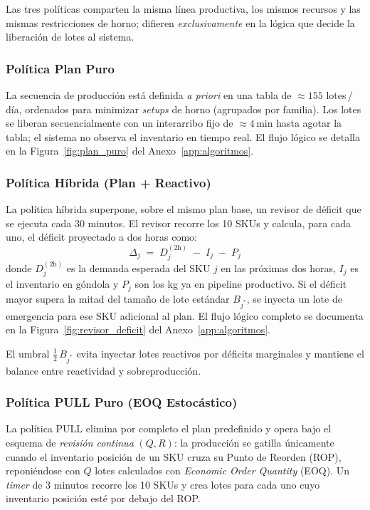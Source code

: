 \documentclass[10pt, a4paper]{article}
\begin{document}
Las tres pol\'iticas comparten la misma l\'inea productiva, los mismos
recursos y las mismas restricciones de horno; difieren \emph{exclusivamente}
en la l\'ogica que decide la liberaci\'on de lotes al sistema.

\subsubsection{Pol\'itica Plan Puro}

La secuencia de producci\'on est\'a definida \emph{a priori} en una tabla de
$\approx 155$ lotes\,/\,d\'ia, ordenados para minimizar \textit{setups} de
horno (agrupados por familia). Los lotes se liberan secuencialmente con un
interarribo fijo de $\approx 4$\,min hasta agotar la tabla; el sistema no
observa el inventario en tiempo real. El flujo l\'ogico se detalla en la
Figura~\ref{fig:plan_puro} del Anexo~\ref{app:algoritmos}.

\subsubsection{Pol\'itica H\'ibrida (Plan + Reactivo)}

La pol\'itica h\'ibrida superpone, sobre el mismo plan base, un revisor de
d\'eficit que se ejecuta cada 30 minutos. El revisor recorre los 10 SKUs y
calcula, para cada uno, el d\'eficit proyectado a dos horas como:
\[
\Delta_j \;=\; D^{(2\mathrm{h})}_j \;-\; I_j \;-\; P_j
\]
donde $D^{(2\mathrm{h})}_j$ es la demanda esperada del SKU $j$ en las
pr\'oximas dos horas, $I_j$ es el inventario en g\'ondola y $P_j$ son los kg
ya en pipeline productivo. Si el d\'eficit mayor supera la mitad del tama\~no
de lote est\'andar $B_{j^*}$, se inyecta un lote de emergencia para ese SKU
adicional al plan. El flujo l\'ogico completo se documenta en la
Figura~\ref{fig:revisor_deficit} del Anexo~\ref{app:algoritmos}.

El umbral $\tfrac{1}{2}\,B_{j^*}$ evita inyectar lotes reactivos por
d\'eficits marginales y mantiene el balance entre reactividad y
sobreproducci\'on.

\subsubsection{Pol\'itica PULL Puro (EOQ Estoc\'astico)}

La pol\'itica PULL elimina por completo el plan predefinido y opera bajo el
esquema de \textit{revisi\'on continua} $(Q, R)$: la producci\'on se gatilla
\'unicamente cuando el inventario posici\'on de un SKU cruza su Punto de
Reorden (ROP), reponi\'endose con $Q$ lotes calculados con \textit{Economic
Order Quantity} (EOQ). Un \textit{timer} de 3 minutos recorre los 10 SKUs y
crea lotes para cada uno cuyo inventario posici\'on est\'e por debajo del ROP.
\end{document}
